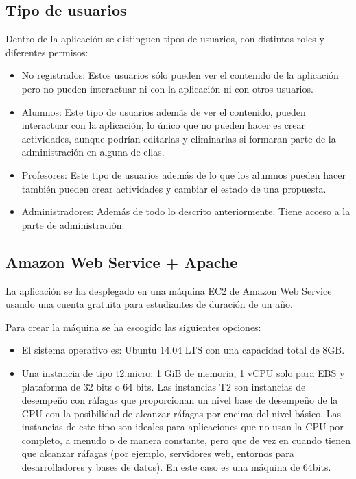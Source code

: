 \subsection{Tipo de usuarios} 
\label{subsec:usuarios}


Dentro de la aplicación se distinguen tipos de usuarios, con distintos roles y diferentes permisos:

\begin{itemize}
\item No registrados: Estos usuarios sólo pueden ver el contenido de la aplicación pero no pueden interactuar ni con la aplicación ni con otros usuarios.
\item Alumnos: Este tipo de usuarios además de ver el contenido, pueden interactuar con la aplicación, lo único que no pueden hacer es crear actividades, aunque podrían editarlas y eliminarlas si formaran parte de la administración en alguna de ellas.
\item Profesores: Este tipo de usuarios además de lo que los alumnos pueden hacer también pueden crear actividades y cambiar el estado de una propuesta.
\item Administradores: Además de todo lo descrito anteriormente. Tiene acceso a la parte de administración.
\end{itemize}


\subsection{Amazon Web Service + Apache} 
\label{subsec:aws_apache}

La aplicación se ha desplegado en una máquina EC2 de Amazon Web Service usando una cuenta gratuita para estudiantes de duración de un año.

Para crear la máquina se ha escogido las siguientes opciones:
\begin{itemize}
\item El sistema operativo es: Ubuntu 14.04 LTS con una capacidad total de 8GB.
\item Una instancia de tipo t2.micro: 1 GiB de memoria, 1 vCPU solo para EBS y plataforma de 32 bits o 64 bits. Las instancias T2 son instancias de desempeño con ráfagas que proporcionan un nivel base de desempeño de la CPU con la posibilidad de alcanzar ráfagas por encima del nivel básico. Las instancias de este tipo son ideales para aplicaciones que no usan la CPU por completo, a menudo o de manera constante, pero que de vez en cuando tienen que alcanzar ráfagas (por ejemplo, servidores web, entornos para desarrolladores y bases de datos). En este caso es una máquina de 64bits.
\end{itemize}

